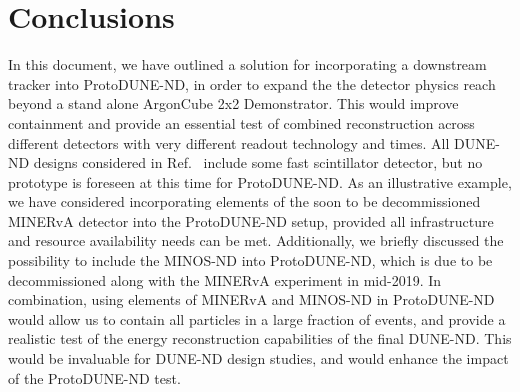 \section{Conclusions}
\label{sec:conclusions}

In this document, we have outlined a solution for incorporating a downstream tracker into ProtoDUNE-ND, in order to expand the the detector physics reach beyond a stand alone ArgonCube 2x2 Demonstrator. 
This would improve containment and provide an essential test of combined reconstruction across different detectors with very different readout technology and times. 
All DUNE-ND designs considered in Ref.~\cite{dune_ndcsg} include some fast scintillator detector, but no prototype is foreseen at this time for ProtoDUNE-ND. 
As an illustrative example, we have considered incorporating elements of the soon to be decommissioned MINERvA detector into the ProtoDUNE-ND setup, provided all infrastructure and resource availability needs can be met. 
Additionally, we briefly discussed the possibility to include the MINOS-ND into ProtoDUNE-ND, which is due to be decommissioned along with the MINERvA experiment in mid-2019. In combination, using elements of MINERvA and MINOS-ND in ProtoDUNE-ND would allow us to contain all particles in a large fraction of events, and provide a realistic test of the energy reconstruction capabilities of the final DUNE-ND. This would be invaluable for DUNE-ND design studies, and would enhance the impact of the ProtoDUNE-ND test.

